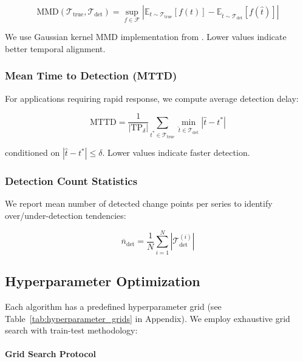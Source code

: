 \documentclass[journal,article,submit,pdftex,moreauthors]{Definitions/mdpi}
\begin{document}
\begin{equation}
\text{MMD}(\mathcal{T}_{\text{true}}, \mathcal{T}_{\text{det}}) = \sup_{f \in \mathcal{F}} \left| \mathbb{E}_{t \sim \mathcal{T}_{\text{true}}}[f(t)] - \mathbb{E}_{\hat{t} \sim \mathcal{T}_{\text{det}}}[f(\hat{t})] \right|
\end{equation}

We use Gaussian kernel MMD implementation from \cite{gretton2012kernel}. Lower values indicate better temporal alignment.

\subsubsection{Mean Time to Detection (MTTD)}

For applications requiring rapid response, we compute average detection delay:

\begin{equation}
\text{MTTD} = \frac{1}{|\text{TP}_\delta|} \sum_{t^* \in \mathcal{T}_{\text{true}}} \min_{\hat{t} \in \mathcal{T}_{\text{det}}} |\hat{t} - t^*|
\end{equation}

conditioned on $|\hat{t} - t^*| \leq \delta$. Lower values indicate faster detection.

\subsubsection{Detection Count Statistics}

We report mean number of detected change points per series to identify over/under-detection tendencies:

\begin{equation}
\overline{n}_{\text{det}} = \frac{1}{N} \sum_{i=1}^{N} |\mathcal{T}_{\text{det}}^{(i)}|
\end{equation}

\subsection{Hyperparameter Optimization}
\label{sec:hyperparameter_opt}

Each algorithm has a predefined hyperparameter grid (see Table~\ref{tab:hyperparameter_grids} in Appendix). We employ exhaustive grid search with train-test methodology:

\paragraph{Grid Search Protocol}
\end{document}
